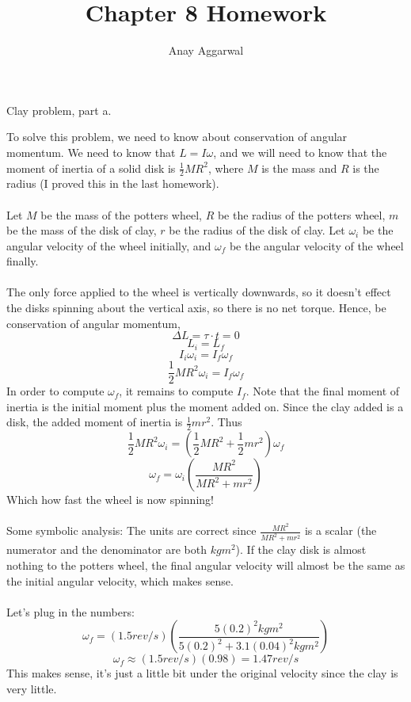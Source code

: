 \documentclass[11pt]{scrartcl}
\title{Chapter 8 Homework}
\author{Anay Aggarwal}
\begin{document}
\maketitle
\begin{example}
  Clay problem, part a.
\end{example}
\begin{soln}
  To solve this problem, we need to know about conservation of
  angular momentum. We need to know that $L=I\omega$, and we will
  need to know that the moment of inertia of a solid disk is $\frac{1}{2}MR^2$,
  where $M$ is the mass and $R$ is the radius (I proved this in the last homework).
  \\ \\
  Let $M$ be the mass of the potters wheel, $R$ be the radius of the potters wheel,
  $m$ be the mass of the disk of clay, $r$ be the radius of the disk of clay. Let $\omega_i$
  be the angular velocity of the wheel initially, and $\omega_f$ be the angular velocity of the
  wheel finally.
  \\ \\
  The only force applied to the wheel is vertically downwards, so it doesn't effect
  the disks spinning about the vertical axis, so there is no net torque. Hence, be conservation
  of angular momentum,
  $$\Delta L=\tau \cdot t = 0$$
  $$L_i=L_f$$
  $$I_i \omega_i = I_f \omega_f$$
  $$\frac{1}{2}MR^2 \omega_i=I_f \omega_f$$
  In order to compute $\omega_f$, it remains to compute $I_f$. Note that the final
  moment of inertia is the initial moment plus the moment added on.
  Since the clay added is a disk, the added moment of inertia is $\frac{1}{2}mr^2$.
  Thus
  $$\frac{1}{2}MR^2 \omega_i=\left(\frac12 MR^2+\frac12 mr^2\right)\omega_f$$
  $$\omega_f=\omega_i\left(\frac{MR^2}{MR^2+mr^2}\right)$$
  Which how fast the wheel is now spinning!
  \\ \\
  Some symbolic analysis: The units are correct since $\frac{MR^2}{MR^2+mr^2}$ is a
  scalar (the numerator and the denominator are both $kg m^2$). If the clay disk is
  almost nothing to the potters wheel, the final angular velocity will almost be
  the same as the initial angular velocity, which makes sense.
  \\ \\
  Let's plug in the numbers:
  $$\omega_f=(1.5 rev/s)\left(\frac{5(0.2)^2 kg m^2}{5(0.2)^2 + 3.1(0.04)^2 kg m^2}\right)$$
  $$\omega_f\approx (1.5 rev/s)(0.98)=1.47 rev/s$$
  This makes sense, it's just a little bit under the original velocity since the clay
  is very little.
\end{soln}
\end{document}
